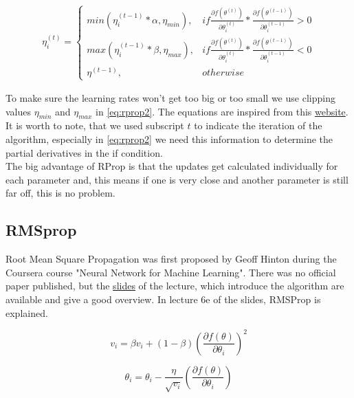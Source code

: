 \documentclass[aodsor,preprint]{imsart}
\numberwithin{equation}{section}
\theoremstyle{plain}
\begin{document}
\begin{align} \label{eq:rprop2}
\eta_{i}^{(t)} = \left\{ 
	\begin{array}{ll}
		min(\eta_{i}^{(t-1)}*\alpha, \eta_{min}),& if \frac{\partial f(\theta^{(t)})}{\partial \theta_{i}^{(t)}} * \frac{\partial f(\theta^{(t-1)})}{\partial \theta_{i}^{(t-1)}} > 0\\
		max(\eta_{i}^{(t-1)}*\beta, \eta_{max}), & if \frac{\partial f(\theta^{(t)})}{\partial \theta_{i}^{(t)}} * \frac{\partial f(\theta^{(t-1)})}{\partial \theta_{i}^{(t-1)}} < 0\\
		\eta^{(t-1)}, & otherwise
	\end{array}		
\right.
\end{align}

To make sure the learning rates won't get too big or too small we use clipping values $\eta_{min}$ and $\eta_{max}$ in \ref{eq:rprop2}. The equations are inspired from this \href{https://florian.github.io/rprop/}{website}. It is worth to note, that we used subscript $t$ to indicate the iteration of the algorithm, especially in \ref{eq:rprop2} we need this information to determine the partial derivatives in the if condition. \\
The big advantage of RProp is that the updates get calculated individually for each parameter and, this means if one is very close and another parameter is still far off, this is no problem. 

\subsection{RMSprop}
Root Mean Square Propagation was first proposed by Geoff Hinton during the Coursera course "Neural Network for Machine Learning". There was no official paper published, but the \href{https://www.cs.toronto.edu/~tijmen/csc321/slides/lecture_slides_lec6.pdf}{slides} of the lecture, which introduce the algorithm are available and give a good overview. In lecture 6e of the slides, RMSProp is explained.

\begin{equation} \label{eq:rmsprop1}
v_{i} = \beta v_{i} + (1-\beta) \left(\frac{\partial f(\theta)}{\partial \theta_{i}}\right)^2
\end{equation}

\begin{equation} \label{eq:rmsprop2}
\theta_{i} = \theta_{i} - \frac{\eta}{\sqrt{v_{i}}} \left(\frac{\partial f(\theta)}{\partial \theta_{i}} \right)
\end{equation}
\end{document}
